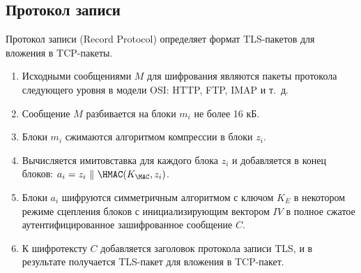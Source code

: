 \subsection{Протокол записи}

Протокол записи (Record Protocol) определяет формат TLS-пакетов для вложения в TCP-пакеты.

\begin{enumerate}
    \item Исходными сообщениями $M$ для шифрования являются пакеты протокола следующего уровня в модели OSI: HTTP, FTP, IMAP и т.~д.
    \item Сообщение $M$ разбивается на блоки $m_i$ не более 16 кБ.
    \item Блоки $m_i$ сжимаются алгоритмом компрессии в блоки $z_i$.
    \item Вычисляется имитовставка для каждого блока $z_i$ и добавляется в конец блоков: $a_i = z_i ~\|~ \HMAC(K_{\MAC}, z_i)$.
    \item Блоки $a_i$ шифруются симметричным алгоритмом с ключом $K_E$ в некотором режиме сцепления блоков с инициализирующим вектором $IV$ в полное сжатое аутентифицированное зашифрованное сообщение $C$.
    \item К шифротексту $C$ добавляется заголовок протокола записи TLS, и в результате получается TLS-пакет для вложения в TCP-пакет.
\end{enumerate}
